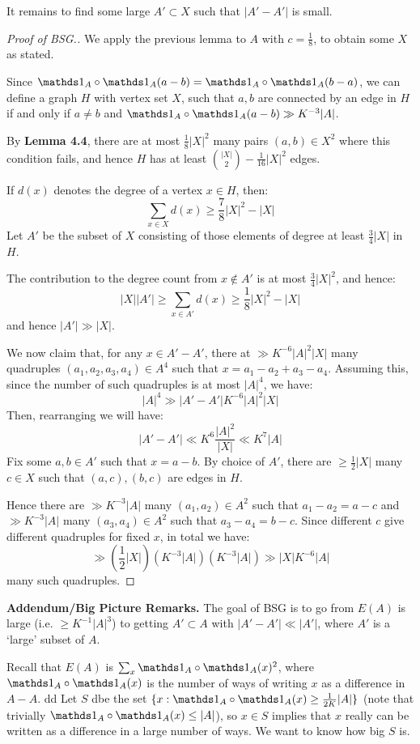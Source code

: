 \documentclass[10pt,a4paper]{article}
\begin{document}
It remains to find some large $A'\subset X$ such that $|A'-A'|$ is small.
\begin{proof}[Proof of BSG.]
  We apply the previous lemma to $A$ with $c = \frac18$, to obtain some $X$ as stated.

  Since $\one_A \circ \one_A(a-b) = \one_A\circ \one_A(b-a)$, we can define a graph $H$ with vertex set $X$, such that $a,b$ are connected by an edge in $H$ if and only if $a \neq b$ and $\one_A \circ \one_A(a-b) \gg K^{-3}|A|$.

  By \textbf{Lemma 4.4}, there are at most $\frac18|X|^2$ many pairs $(a,b) \in X^2$ where this condition fails, and hence $H$ has at least $\binom{|X|}{2} - \frac{1}{16}|X|^2$ edges.

  If $d(x)$ denotes the degree of a vertex $x \in H$, then:
  \[\sum_{x \in X} d(x) \geq \frac{7}{8}|X|^2 - |X|\]
  Let $A'$ be the subset of $X$ consisting of those elements of degree at least $\frac34|X|$ in $H$.

  The contribution to the degree count from $x \notin A'$ is at most $\frac{3}{4}|X|^2$, and hence:
  \[|X||A'| \geq\sum_{x \in A'} d(x) \geq \frac18 |X|^2-|X|\]
  and hence $|A'| \gg |X|$.

  We now claim that, for any $x \in A'-A'$, there at $\gg K^{-6}|A|^2 |X|$ many quadruples $(a_1,a_2,a_3,a_4) \in A^4$ such that $x=a_1-a_2+a_3-a_4$. Assuming this, since the number of such quadruples is at most $|A|^4$, we have:
  \[|A|^4 \gg |A'-A'|K^{-6}|A|^2|X|\]
  Then, rearranging we will have:
  \[|A'-A'| \ll K^6 \frac{|A|^2}{|X|} \ll K^7|A|\]
  Fix some $a,b \in A'$ such that $x = a-b$. By choice of $A'$, there are $\geq \frac12 |X|$ many $c \in X$ such that $(a,c), (b,c)$ are edges in $H$.

  Hence there are $\gg K^{-3}|A|$ many $(a_1,a_2) \in A^2$ such that $a_1-a_2 = a-c$ and $\gg K^{-3}|A|$ many $(a_3,a_4) \in A^2$ such that $a_3-a_4=b-c$. Since different $c$ give different quadruples for fixed $x$, in total we have:
  \[\gg\left(\frac12|X|\right)\left(K^{-3}|A|\right)\left(K^{-3}|A|\right)\gg |X|K^{-6}|A|\]
  many such quadruples.
\end{proof}
\textbf{Addendum/Big Picture Remarks.} The goal of BSG is to go from $E(A)$ is large (i.e. $\geq K^{-1}|A|^3$) to getting $A'\subset A$ with $|A'-A'| \ll |A'|$, where $A'$ is a `large' subset of $A$.

Recall that $E(A)$ is $\sum_x \one_A\circ\one_A(x)^2$, where $\one_A\circ\one_A(x)$ is the number of ways of writing $x$ as a difference in $A-A$.
dd
Let $S$ dbe the set $\{x: \one_A \circ \one_A(x) \geq \frac{1}{2K}|A|\}$ (note that trivially $\one_A\circ\one_A(x) \leq |A|$), so $x \in S$ implies that $x$ really can be written as a difference in a large number of ways. We want to know how big $S$ is.
\end{document}
